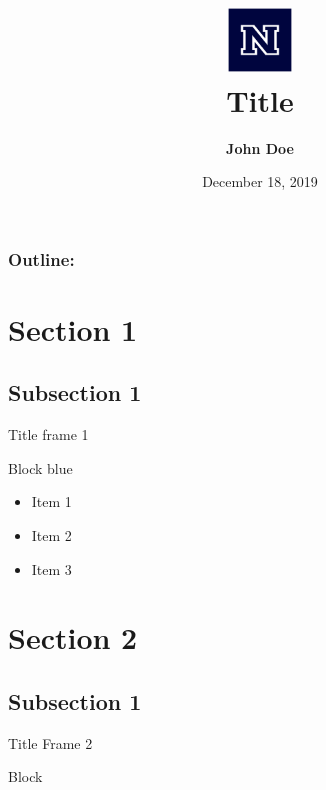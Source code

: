 \documentclass[xcolor=dvipsnames, hyperref=hidelinks, url=hyphens]{beamer}
\title[Title]{\includegraphics[height=1.7cm]{images/nevada-blockn-blue.eps}\\Title\vspace{-2ex}} %
\author[John Doe]{ \textbf{John Doe}}
\institute[UNR]{University of Nevada, Reno}
\date{December 18, 2019}
\begin{document}
{
  \begin{frame}
    \vspace{6em}%
    \titlepage
  \end{frame}
}
\begin{frame}
  \frametitle{\textbf{Outline:}}
  \tableofcontents
\end{frame}

\section{Section 1}  
\subsection{Subsection 1}
\begin{frame}{Title frame 1}
  \begin{block}{Block blue}
    \begin{itemize}
    \item Item 1
    \item Item 2
    \item Item 3
    \end{itemize}
  \end{block}  
\end{frame}

\section{Section 2}
\subsection{Subsection 1}
\begin{frame}{Title Frame 2}
  \begin{block}{Block}
    \lipsum[2]
  \end{block}
\end{frame}

\end{document}
